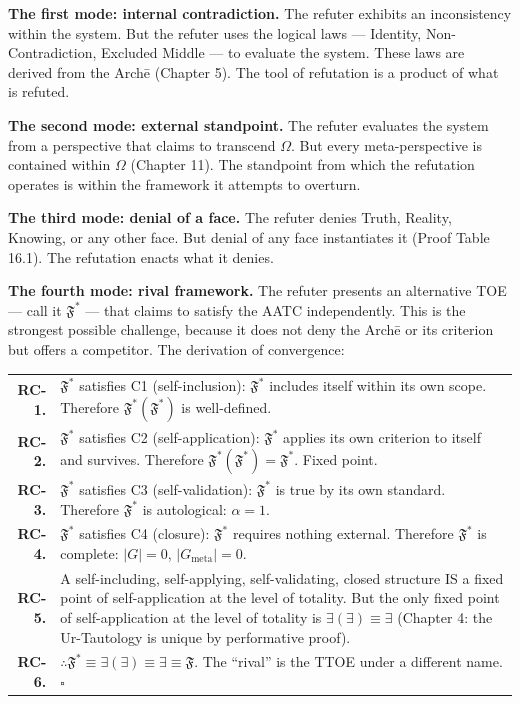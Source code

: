 \documentclass[10pt, openany, oneside]{book}
\renewcommand{\footnotesize}{\fontsize{8.5}{11}\selectfont}
\begin{document}
\textbf{The first mode: internal contradiction.} The refuter exhibits an inconsistency within the system. But the refuter uses the logical laws --- Identity, Non-Contradiction, Excluded Middle --- to evaluate the system. These laws are derived from the Arch\={e} (Chapter 5). The tool of refutation is a product of what is refuted.

\textbf{The second mode: external standpoint.} The refuter evaluates the system from a perspective that claims to transcend $\Omega$. But every meta-perspective is contained within $\Omega$ (Chapter 11). The standpoint from which the refutation operates is within the framework it attempts to overturn.

\textbf{The third mode: denial of a face.} The refuter denies Truth, Reality, Knowing, or any other face. But denial of any face instantiates it (Proof Table 16.1). The refutation enacts what it denies.

\textbf{The fourth mode: rival framework.} The refuter presents an alternative TOE --- call it $\mathfrak{F}^*$ --- that claims to satisfy the AATC independently. This is the strongest possible challenge, because it does not deny the Arch\={e} or its criterion but offers a competitor. The derivation of convergence:

\vspace{0.5em}

{\footnotesize
\noindent\begin{tabular}{r p{}}
\textbf{RC-1.} & $\mathfrak{F}^*$ satisfies C1 (self-inclusion): $\mathfrak{F}^*$ includes itself within its own scope. Therefore $\mathfrak{F}^*(\mathfrak{F}^*)$ is well-defined. \\[0.3em]
\textbf{RC-2.} & $\mathfrak{F}^*$ satisfies C2 (self-application): $\mathfrak{F}^*$ applies its own criterion to itself and survives. Therefore $\mathfrak{F}^*(\mathfrak{F}^*) = \mathfrak{F}^*$. Fixed point. \\[0.3em]
\textbf{RC-3.} & $\mathfrak{F}^*$ satisfies C3 (self-validation): $\mathfrak{F}^*$ is true by its own standard. Therefore $\mathfrak{F}^*$ is autological: $\alpha = 1$. \\[0.3em]
\textbf{RC-4.} & $\mathfrak{F}^*$ satisfies C4 (closure): $\mathfrak{F}^*$ requires nothing external. Therefore $\mathfrak{F}^*$ is complete: $|G| = 0$, $|G_{\text{meta}}| = 0$. \\[0.3em]
\textbf{RC-5.} & A self-including, self-applying, self-validating, closed structure IS a fixed point of self-application at the level of totality. But the only fixed point of self-application at the level of totality is $\exists(\exists) \equiv \exists$ (Chapter 4: the Ur-Tautology is unique by performative proof). \\[0.3em]
\textbf{RC-6.} & $\therefore \mathfrak{F}^* \equiv \exists(\exists) \equiv \exists \equiv \mathfrak{F}$. The ``rival'' is the TTOE under a different name. $\square$ \\[0.3em]
\end{tabular}
}
\end{document}
